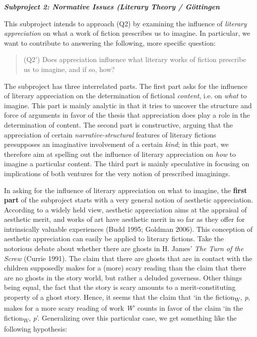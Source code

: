 
\vspace{.2cm}
\noindent\textbf{\emph{Subproject 2: Normative Issues (Literary Theory / G\"ottingen}}
\vspace{.1cm}

\noindent This subproject intends to approach (Q2) by examining the influence of \emph{literary appreciation} on what a work of fiction prescribes us to imagine. In particular, we want to contribute to answering the following, more specific question:

\vspace{-.2cm}
\begin{quote}
(Q2') Does appreciation influence what literary works of fiction prescribe us to imagine, and if so, how?
\end{quote}
\vspace{-.2cm}

\noindent The subproject has three interrelated parts. The first part asks for the influence of literary appreciation on the determination of fictional \emph{content}, i.e. on \emph{what} to imagine. This part is mainly analytic in that it tries to uncover the structure and force of arguments in favor of the thesis that appreciation does play a role in the determination of content. The second part is constructive, arguing that the appreciation of certain \emph{narrative-structural} features of literary fictions presupposes an imaginative involvement of a certain \emph{kind}; in this part, we therefore aim at spelling out the influence of literary appreciation on \emph{how} to imagine a particular content. The third part is mainly speculative in focusing on implications of both ventures for the very notion of prescribed imaginings.

In asking for the influence of literary appreciation on what to imagine, the \textbf{first part} of the subproject starts with a very general notion of aesthetic appreciation. According to a widely held view, aesthetic appreciation aims at the appraisal of aesthetic merit, and works of art have aesthetic merit in so far as they offer for intrinsically valuable experiences (Budd 1995; Goldman 2006). This conception of aesthetic appreciation can easily be applied to literary fictions. Take the notorious debate about whether there are ghosts in H. James' \emph{The Turn of the Screw} (Currie 1991). The claim that there are ghosts that are in contact with the children supposedly makes for a (more) scary reading than the claim that there are no ghosts in the story world, but rather a deluded governess. Other things being equal, the fact that the story is scary amounts to a merit-constituting property of a ghost story. Hence, it seems that the claim that `in the fiction\textsubscript{W}, \emph{p}, makes for a more scary reading of work \emph{W}' counts in favor of the claim `in the fiction\textsubscript{W}, \emph{p}'. Generalizing over this particular case, we get something like the following hypothesis: 

